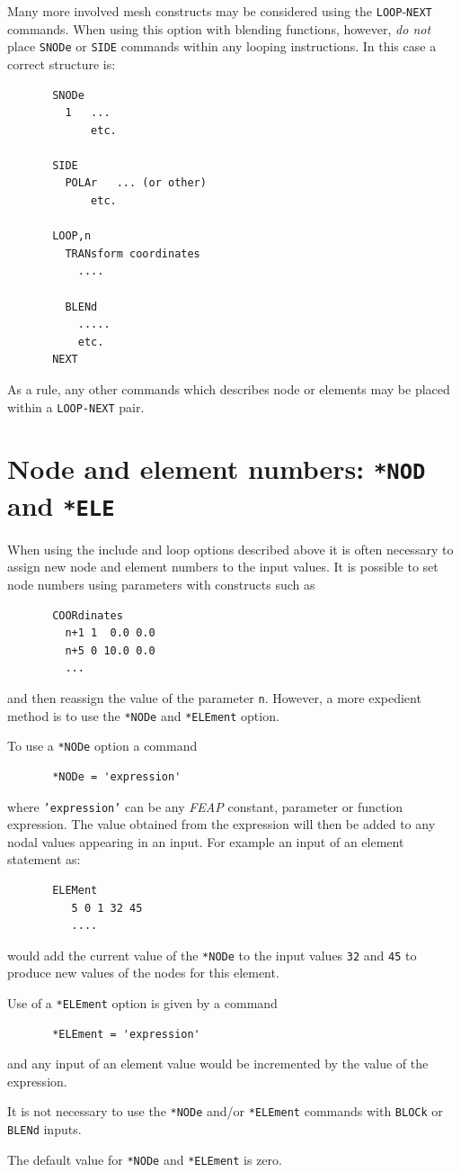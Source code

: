 Many more involved mesh constructs may be considered using the
\texttt{LOOP}-\texttt{NEXT} commands.  When using this option with blending
functions, however, \textit{do not} place \texttt{SNODe} or \texttt{SIDE}
commands within any looping instructions.  In this case a correct
structure is:
\begin{verbatim}
       SNODe
         1   ...
             etc.

       SIDE
         POLAr   ... (or other)
             etc.

       LOOP,n
         TRANsform coordinates
           ....

         BLENd
           .....
           etc.
       NEXT
\end{verbatim}
As a rule, any other commands which describes node or elements may
be placed within a \texttt{LOOP-NEXT} pair.

\section{Node and element numbers: \texttt{*NOD} and \texttt{*ELE}}
\label{stars}

When using the include and loop options described above it is often necessary
to assign new node and element numbers to the input values.  It is
possible to set node numbers using parameters with constructs such as
\begin{verbatim}
       COORdinates
         n+1 1  0.0 0.0
         n+5 0 10.0 0.0
         ...
\end{verbatim}
and then reassign the value of the parameter \texttt{n}.   However, a more
expedient method is to use the \texttt{*NODe} and \texttt{*ELEment} option.

To use a \texttt{*NODe} option a command
\begin{verbatim}
       *NODe = 'expression'
\end{verbatim}
where \texttt{'expression'} can be any \textsl{FEAP} constant, parameter or
function expression.  The value obtained from the expression will then be
added to any nodal values appearing in an input.  For example an input of
an element statement as:
\begin{verbatim}
       ELEMent
          5 0 1 32 45
          ....
\end{verbatim}
would add the current value of the \texttt{*NODe} to the input values
\texttt{32} and \texttt{45} to produce new values of the nodes for this
element.

Use of a \texttt{*ELEment} option is given by a command
\begin{verbatim}
       *ELEment = 'expression'
\end{verbatim}
and any input of an element value would be incremented by the value of the
expression.

It is not necessary to use the \texttt{*NODe} and/or \texttt{*ELEment}
commands with \texttt{BLOCk} or \texttt{BLENd} inputs.

The default value for \texttt{*NODe} and \texttt{*ELEment} is zero.

